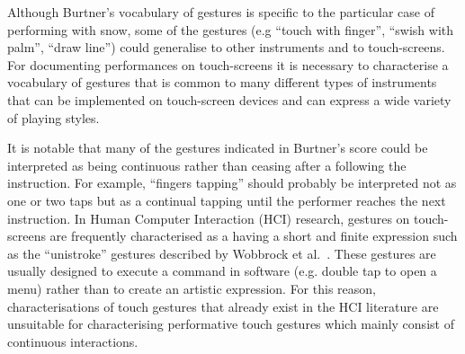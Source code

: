 \documentclass[graybox]{svmult}
\begin{document}

Although Burtner's vocabulary of gestures is specific to the
particular case of performing with snow, some of the gestures (e.g
``touch with finger'', ``swish with palm'', ``draw line'') could
generalise to other instruments and to touch-screens. For documenting
performances on touch-screens it is necessary to characterise a
vocabulary of gestures that is common to many different types of
instruments that can be implemented on touch-screen devices and can
express a wide variety of playing styles.

It is notable that many of the gestures indicated in Burtner's score
could be interpreted as being continuous rather than ceasing after a
following the instruction. For example, ``fingers tapping'' should
probably be interpreted not as one or two taps but as a continual
tapping until the performer reaches the next instruction. In Human Computer 
Interaction (HCI) 
research, gestures on touch-screens are frequently characterised as a
having a short and finite expression such as the ``unistroke''
gestures described by Wobbrock et al.~\cite{Wobbrock:2007kq}. These
gestures are usually designed to execute a command in software (e.g.
double tap to open a menu) rather than to create an artistic
expression. For this reason, characterisations of touch gestures that
already exist in the HCI literature are unsuitable for characterising
performative touch gestures which mainly consist of continuous
interactions.
\end{document}
